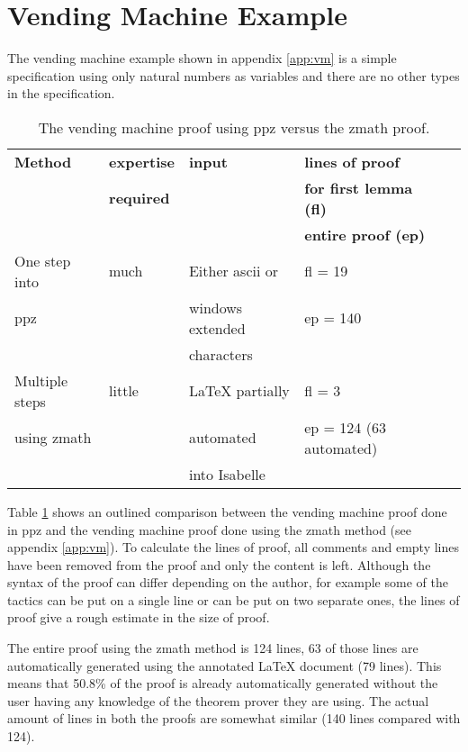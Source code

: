 \section{Vending Machine Example}

The vending machine example shown in appendix \ref{app:vm} is a simple
specification using only natural numbers as variables and there are no other
types in the specification. 

\begin{table}[H]
\begin{center}
\begin{tabular}{| l || l | l | l | l |}
\hline
\textbf{Method} & \textbf{expertise} &  \textbf{input} & \textbf{lines of proof}
\\
& \textbf{required} & & \textbf{for first lemma (fl)}  \\
& & & \textbf{entire proof (ep)} \\
\hline
One step into & much & Either ascii or & fl = 19  \\
\gls{ppz} & & windows extended & ep = 140 \\
& & characters & \\
\hline
Multiple steps & little & \LaTeX{} partially & fl = 3  \\
using \gls{zmath} & & automated & ep = 124 (63 automated) \\
& & into Isabelle & \\
\hline
\end{tabular}
\end{center}
\caption{The vending machine proof using \gls{ppz} versus the \gls{zmath} proof.}
\label{tab:comparevm}
\end{table}

Table \ref{tab:comparevm} shows an outlined comparison between the vending
machine proof done in \gls{ppz} \cite{pp} and the vending machine proof done
using the \gls{zmath} method (see appendix \ref{app:vm}). To calculate the lines
of proof, all comments and empty lines have been removed from the proof and only
the content is left. Although the syntax of the proof can differ depending on
the author, for example some of the tactics can be put on a single line or can
be put on two separate ones, the lines of proof give a rough estimate in the
size of  proof.

The entire proof using the \gls{zmath} method is 124 lines, 63 of those lines
are automatically generated using the annotated \LaTeX{} document (79 lines).
This means that 50.8\% of the proof is already automatically generated without
the user having any knowledge of the theorem prover they are using. The actual
amount of lines in both the proofs are somewhat similar (140 lines compared with
124).


